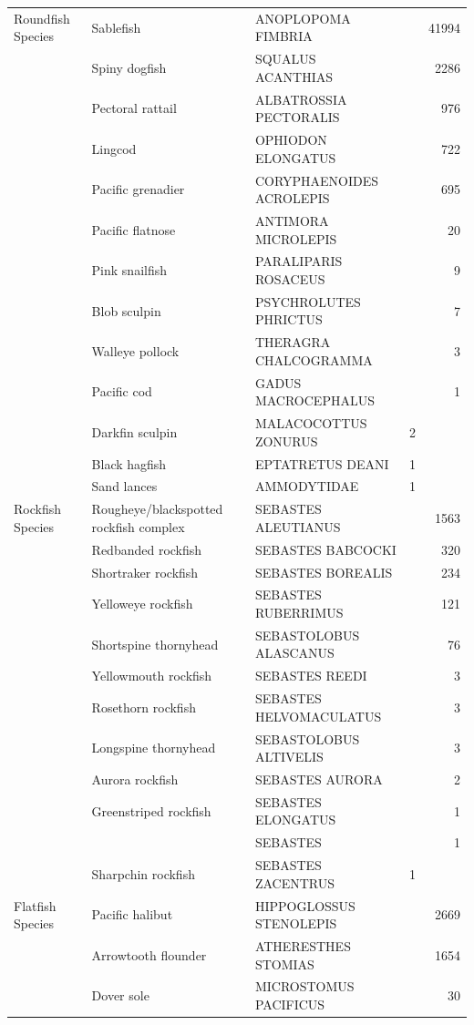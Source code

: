 \documentclass[12pt]{article}\usepackage[]{graphicx}\usepackage[]{color}
\begin{document}
\begin{longtable}[l]{lllrr}
\endfoot
\bottomrule
\endlastfoot
Roundfish Species & Sablefish & ANOPLOPOMA FIMBRIA &  & 41994\\
 & Spiny dogfish & SQUALUS ACANTHIAS &  & 2286\\
 & Pectoral rattail & ALBATROSSIA PECTORALIS &  & 976\\
 & Lingcod & OPHIODON ELONGATUS &  & 722\\
 & Pacific grenadier & CORYPHAENOIDES ACROLEPIS &  & 695\\
 & Pacific flatnose & ANTIMORA MICROLEPIS &  & 20\\
 & Pink snailfish & PARALIPARIS ROSACEUS &  & 9\\
 & Blob sculpin & PSYCHROLUTES PHRICTUS &  & 7\\
 & Walleye pollock & THERAGRA CHALCOGRAMMA &  & 3\\
 & Pacific cod & GADUS MACROCEPHALUS &  & 1\\
 & Darkfin sculpin & MALACOCOTTUS ZONURUS & 2 & \\
 & Black hagfish & EPTATRETUS DEANI & 1 & \\
 & Sand lances & AMMODYTIDAE & 1 & \\
\midrule
Rockfish Species & Rougheye/blackspotted rockfish complex & SEBASTES ALEUTIANUS &  & 1563\\
 & Redbanded rockfish & SEBASTES BABCOCKI &  & 320\\
 & Shortraker rockfish & SEBASTES BOREALIS &  & 234\\
 & Yelloweye rockfish & SEBASTES RUBERRIMUS &  & 121\\
 & Shortspine thornyhead & SEBASTOLOBUS ALASCANUS &  & 76\\
 & Yellowmouth rockfish & SEBASTES REEDI &  & 3\\
 & Rosethorn rockfish & SEBASTES HELVOMACULATUS &  & 3\\
 & Longspine thornyhead & SEBASTOLOBUS ALTIVELIS &  & 3\\
 & Aurora rockfish & SEBASTES AURORA &  & 2\\
 & Greenstriped rockfish & SEBASTES ELONGATUS &  & 1\\
 &  & SEBASTES &  & 1\\
 & Sharpchin rockfish & SEBASTES ZACENTRUS & 1 & \\
\midrule
Flatfish Species & Pacific halibut & HIPPOGLOSSUS STENOLEPIS &  & 2669\\
 & Arrowtooth flounder & ATHERESTHES STOMIAS &  & 1654\\
 & Dover sole & MICROSTOMUS PACIFICUS &  & 30\\

\end{longtable}
\end{document}
